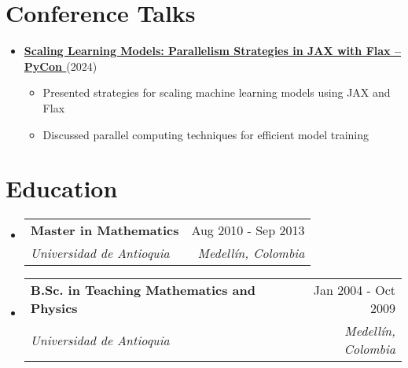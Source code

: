 \documentclass[letterpaper,11pt]{article}
\makeatletter
\newcommand{\resumeSubheading}[4]{
  \vspace{-2pt}
  \item[]
  \begin{tabular*}{\textwidth}{@{\extracolsep{\fill}}l r}
    \textbf{#1} & #2 \\
    \textit{#3} & \textit{#4} \\
  \end{tabular*}
  \vspace{-5pt}
}
\newcommand{\normalfaYoutube}{{\mdseries\faYoutube}}
\makeatother
\begin{document}
\section{Conference Talks}
\begin{itemize}[leftmargin=*]
    \item \textbf{\href{https://www.youtube.com/watch?v=m4hP1soE414}{Scaling Learning Models: Parallelism Strategies in JAX with Flax -- PyCon \normalfaYoutube}} (2024)
    \begin{itemize}[itemsep=0pt]
        \item Presented strategies for scaling machine learning models using JAX and Flax
        \item Discussed parallel computing techniques for efficient model training
    \end{itemize}
\end{itemize}

\section{Education}
\begin{itemize}[leftmargin=0pt, itemindent=0pt, label={}]
\resumeSubheading
{Master in Mathematics}{Aug 2010 - Sep 2013}
{Universidad de Antioquia}{Medellín, Colombia}

\resumeSubheading
{B.Sc. in Teaching Mathematics and Physics}{Jan 2004 - Oct 2009}
{Universidad de Antioquia}{Medellín, Colombia}
\end{itemize}
\end{document}
